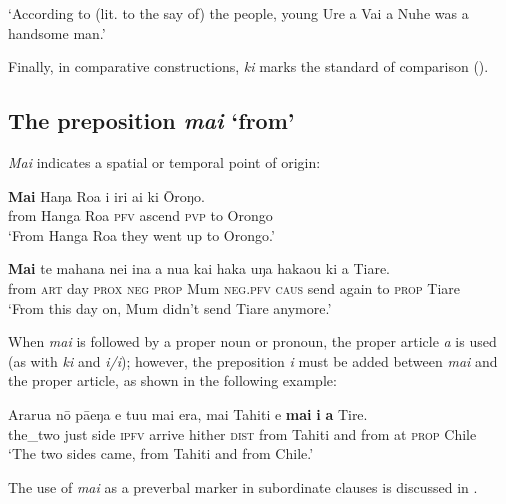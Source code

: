 \glt
‘According to (lit. to the say of) the people, young Ure a Vai a Nuhe was a handsome man.’ \textstyleExampleref{[R532-07.006]}
\z

Finally, in comparative constructions, \textit{ki} marks the standard of comparison (). 
\subsection{The preposition \textit{mai} ‘from’}\label{sec:4.7.4}

\textit{Mai} indicates a spatial or temporal point of origin:

\ea\label{ex:4.270}
\gll \textbf{Mai} Haŋa Roa i iri ai ki {\ꞌ}Ōroŋo. \\
from Hanga Roa \textsc{pfv} ascend \textsc{pvp} to Orongo \\

\glt 
‘From Hanga Roa they went up to Orongo.’ \textstyleExampleref{[Ley-2-02.054]}
\z

\ea\label{ex:4.271}
\gll \textbf{Mai} te mahana nei {\ꞌ}ina a nua kai haka uŋa haka{\ꞌ}ou ki a Tiare. \\
from \textsc{art} day \textsc{prox} \textsc{neg} \textsc{prop} Mum \textsc{neg.pfv} \textsc{caus} send again to \textsc{prop} Tiare \\

\glt 
‘From this day on, Mum didn’t send Tiare anymore.’ \textstyleExampleref{[R179.046]} 
\z

When \textit{mai} is followed by a proper noun or pronoun, the proper article \textit{a} is used (as with \textit{ki} and \textit{i/{\ꞌ}i}); however, the preposition \textit{i} must be added between \textit{mai} and the proper article, as shown in the following example:

\ea\label{ex:4.272}
\gll Ararua nō pā{\ꞌ}eŋa e tu{\ꞌ}u mai era, mai Tahiti {\ꞌ}e \textbf{mai} \textbf{i} \textbf{a} Tire. \\
the\_two just side \textsc{ipfv} arrive hither \textsc{dist} from Tahiti and from at \textsc{prop} Chile \\

\glt 
‘The two sides came, from Tahiti and from Chile.’ \textstyleExampleref{[R539-2.221]}
\z

The use of \textit{mai} as a preverbal marker in subordinate clauses is discussed in .
